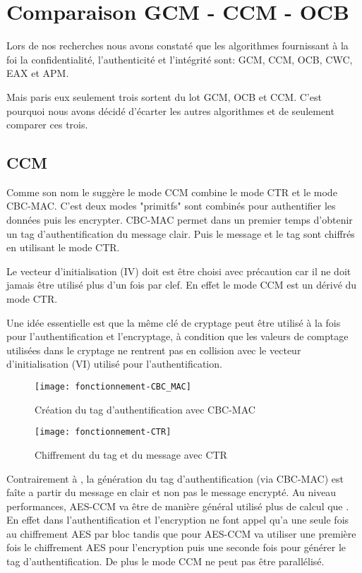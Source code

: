 \chapter{Comparaison GCM - CCM - OCB}

Lors de nos recherches nous avons constaté que les algorithmes fournissant à la foi la confidentialité, l'authenticité et l'intégrité sont: GCM, CCM, OCB, CWC, EAX et APM.

Mais paris eux seulement trois sortent du lot GCM, OCB et CCM. C'est pourquoi nous avons décidé d'écarter les autres algorithmes et de seulement comparer ces trois.

\section{CCM}

Comme son nom le suggère le mode CCM combine le mode CTR et le mode CBC-MAC. C'est deux modes "primitfs" sont combinés pour authentifier les données puis les encrypter. CBC-MAC permet dans un premier temps d'obtenir un tag d'authentification du message clair. Puis le message et le tag sont chiffrés en utilisant le mode CTR.



Le vecteur d'initialisation (IV) doit est être choisi avec précaution car il ne doit jamais être utilisé plus d'un fois par clef. En effet le mode CCM est un dérivé du mode CTR.



Une idée essentielle est que la même clé de cryptage peut être utilisé à la fois pour l'authentification et l'encryptage, à condition que les valeurs de comptage utilisées dans le cryptage ne rentrent pas en collision avec le vecteur d'initialisation (VI) utilisé pour l'authentification.


\begin{figure}[!h]
  \centering
  \texttt{[image: fonctionnement-CBC\_MAC]}
  \caption{Création du tag d'authentification avec CBC-MAC}
  \label{Création du tag d'authentification avec CBC-MAC}
\end{figure}

\begin{figure}[!h]
  \centering
  \texttt{[image: fonctionnement-CTR]}
  \caption{Chiffrement du tag et du message avec CTR}
  \label{Chiffrement du tag et du message avec CTR}
\end{figure}


Contrairement à \aes, la génération du tag d'authentification (via CBC-MAC) est faîte a partir du message en clair et non pas le message encrypté. Au niveau performances, AES-CCM va être de manière général utilisé plus de calcul que \aes. En effet dans \aes l'authentification et l'encryption ne font appel qu'a une seule fois au chiffrement AES par bloc tandis que pour AES-CCM va utiliser une première fois le chiffrement AES pour l'encryption puis une seconde fois pour générer le tag d'authentification. De plus le mode CCM ne peut pas être parallélisé.


